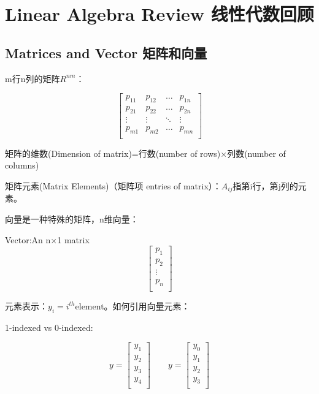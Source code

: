 \documentclass[UTF8]{ctexart}
\begin{document}
\section{Linear Algebra Review 线性代数回顾}
\subsection{Matrices and Vector 矩阵和向量}
m行n列的矩阵$R^{nm}$：

\begin{equation*}
  \begin{bmatrix}
    p_{11} & p_{12} & \ldots & p_{1n} \\
    p_{21} & p_{22} & \ldots & p_{2n} \\
    \vdots & \vdots & \ddots & \vdots \\
    p_{m1} & p_{m2} & \ldots & p_{mn} \\
  \end{bmatrix}
\end{equation*}

矩阵的维数(Dimension of matrix)=行数(number of rows)$\times$列数(number of columns)

矩阵元素(Matrix Elements)（矩阵项 entries of matrix）：$A_{ij}$指第i行，第j列的元素。

向量是一种特殊的矩阵，n维向量：

Vector:An n$\times$1 matrix
\begin{equation*}
  \begin{bmatrix}
    p_{1}  \\
    p_{2}  \\
    \vdots  \\
    p_{n}  \\
  \end{bmatrix}
\end{equation*}

元素表示：$y_{i}=i^{th}$element。如何引用向量元素：

1-indexed vs 0-indexed:

\begin{equation*}
 y=
  \begin{bmatrix}
    y_{1}  \\
    y_{2}  \\
    y_{3} \\
    y_{4}  \\
  \end{bmatrix} \qquad
  y=
   \begin{bmatrix}
     y_{0}  \\
     y_{1}  \\
     y_{2} \\
     y_{3}  \\
   \end{bmatrix}
\end{equation*}
\end{document}
